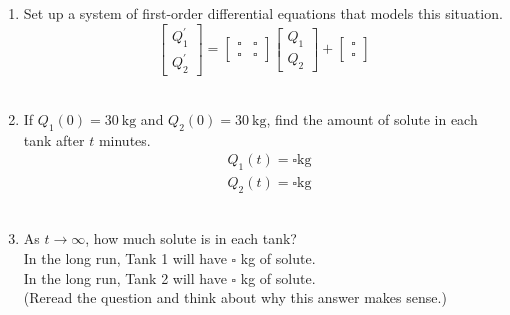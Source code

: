 \begin{enumerate}
  \begin{enumerate}[label=(\alph*)]
    \item Set up a system of first-order differential equations that models this situation.\\
    \[
    \left[\begin{array}{l} Q_1^{\prime} \\ Q_2^{\prime} \end{array}\right]=\left[\begin{array}{rr} \square & \square \\ \square & \square \end{array}\right]\left[\begin{array}{l} Q_1 \\ Q_2 \end{array}\right]+\left[\begin{array}{l} \square \\ \square \end{array}\right]
    \]\\
    \begin{subanswer}
    \end{subanswer}
    \item If $Q_1(0)=30 \mathrm{~kg}$ and $Q_2(0)=30 \mathrm{~kg}$, find the amount of solute in each tank after $t$ minutes.\\
    $$
    \begin{aligned}
    & Q_1(t)=\square \mathrm{kg} \\
    & Q_2(t)=\square \mathrm{kg}
    \end{aligned}
    $$\\
    \begin{subanswer}
    \end{subanswer}
    \item As $t \rightarrow \infty$, how much solute is in each tank?\\
    In the long run, Tank 1 will have $\square$ kg of solute.\\
    In the long run, Tank 2 will have $\square$ kg of solute.\\
    (Reread the question and think about why this answer makes sense.)\\
    \begin{subanswer}
    \end{subanswer}
  \end{enumerate}


  \newpage


\end{enumerate}

